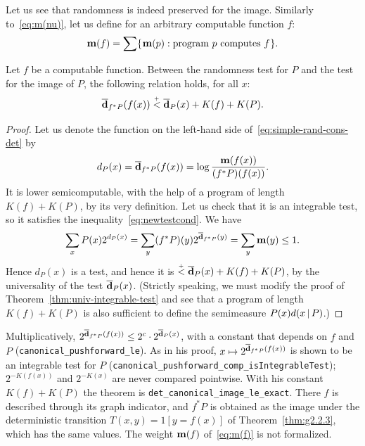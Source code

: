 Let us see that randomness is indeed preserved for the image.
Similarly to~\eqref{eq:m(nu)}, let us define for an arbitrary computable
function $f$:
 \begin{equation}\label{eq:m(f)}
   \mathbf{m}(f) = \sum\mathopen\{\mskip 1mu\mathbf{m}(p) : \text{program $p$ computes $f$}\mskip 1mu\mathclose\}.
 \end{equation}

 \begin{theorem}\label{thm:simple-rand-cons-det}
  \leanok
 Let $f$ be a computable function.
Between the randomness test for $P$ and
the test for the image of $P$, the following relation holds, for
all $x$:
  \begin{equation}\label{eq:simple-rand-cons-det}
  \overline{\mathbf{d}}_{f^{*} P }(f(x)) \stackrel{{}_+}{<} \overline{\mathbf{d}}_{P}(x) + K(f) + K(P).
  \end{equation}
 \end{theorem}
 \begin{proof}
  \leanok
Let us denote the function on the left-hand side
of~\eqref{eq:simple-rand-cons-det} by
 \[
   d_{P}(x) = \overline{\mathbf{d}}_{f^{*}P}(f(x)) = \log\frac{\mathbf{m}(f(x))}{(f^{*}P)(f(x))}.
 \]
It is lower semicomputable, with the help of a program of length
$K(f) + K(P)$, by its very definition.
Let us check that it is an integrable test, so it
satisfies the inequality~\eqref{eq:newtestcond}.
We have
 \[
 \sum_{x} P(x) 2^{d_{P}(x)}
     = \sum_{y} (f^{*}P)(y) 2^{\overline{\mathbf{d}}_{f^{*}P}(y)} =
       \sum_{y} \mathbf{m}(y) \le 1.
 \]
Hence $d_{P}(x)$ is a test, and hence it is
$\stackrel{{}_+}{<} \overline{\mathbf{d}}_{P}(x) + K(f) + K(P)$, by the universality of the test $\overline{\mathbf{d}}_{P}(x)$.
(Strictly speaking, we must modify the proof of
Theorem~\ref{thm:univ-integrable-test} and see that a program of length $K(f) +
K(P)$ is also sufficient to define the semimeasure $P(x) d(x \,\vert\, P)$.)
 \end{proof}

\begin{formalization}
Multiplicatively, \( 2^{\overline{\mathbf{d}}_{f^{*}P}(f(x))} \le 2^{c} \cdot 2^{\overline{\mathbf{d}}_{P}(x)} \), with a
constant that depends on \( f \) and \( P \) (\texttt{canonical\_pushforward\_le}). As in his
proof, \( x \mapsto 2^{\overline{\mathbf{d}}_{f^{*}P}(f(x))} \) is shown to be an integrable test for \( P \)
(\texttt{canonical\_pushforward\_comp\_isIntegrableTest}); \( 2^{-K(f(x))} \) and
\( 2^{-K(x)} \) are never compared pointwise. With his constant \( K(f) + K(P) \) the theorem
is \texttt{det\_canonical\_image\_le\_exact}. There \( f \) is described through its graph
indicator, and \( f^{*}P \) is obtained as the image under the deterministic transition
\( T(x,y) = 1[y = f(x)] \) of Theorem~\ref{thm:g2.2.3}, which has the same values. The weight
\( \mathbf{m}(f) \) of~\eqref{eq:m(f)} is not formalized.
\end{formalization}

